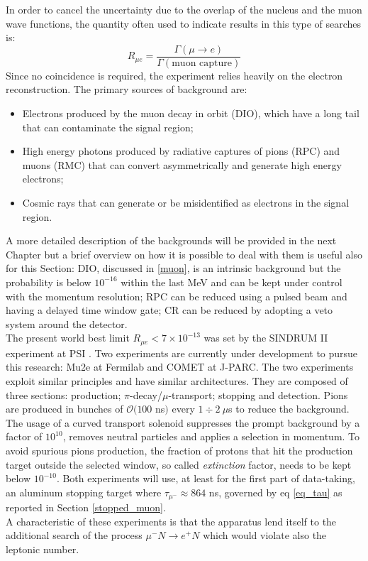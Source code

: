 \documentclass[12pt,a4paper,openright, oneside, titlepage]{book} %
\begin{document}
\noindent
In order to cancel the uncertainty due to the overlap of the nucleus and the muon wave functions, the quantity often used to indicate results in this type of searches is: 
$$R_{\mu e} = \frac{\Gamma(\mu\rightarrow e)}{\Gamma(\textrm{muon capture})}$$
Since no coincidence is required, the experiment relies heavily on the electron reconstruction. 
The primary sources of background are:
\begin{itemize}
\item Electrons produced by the muon decay in orbit (DIO), which have a long tail that can contaminate the signal region;
\item High energy photons produced by radiative captures of pions (RPC) and muons (RMC) that can convert asymmetrically and generate high energy electrons;
\item Cosmic rays that can generate or be misidentified as electrons in the signal region.
\end{itemize}
A more detailed description of the backgrounds will be provided in the next Chapter but a brief overview on how it is possible to deal with them is useful also for this Section: 
DIO, discussed in \ref{muon}, is an intrinsic background but the probability is below $10^{-16}$ within the last MeV and can be kept under control with the momentum resolution; RPC can be reduced using a pulsed beam and having a delayed time window gate; CR can be reduced by adopting a veto system around the detector.\\
The present world best limit  $R_{\mu e}<7\times10^{-13}$ was set by the SINDRUM II experiment at PSI \cite{SINDRUMII}.
Two experiments are currently under development to pursue this research: Mu2e \cite{MTDR} at Fermilab and COMET \cite{COMET_I} at J-PARC. 
The two experiments exploit similar principles and have similar architectures.
They are composed of three sections: production; $\pi$-decay/$\mu$-transport; stopping and detection. 
Pions are produced in bunches of $\mathcal{O}(100$ ns$)$ every $1\div 2\ \mu$s to reduce the background. 
The usage of a curved transport solenoid suppresses the prompt background by a factor of $10^{10}$, removes neutral particles and applies a selection in momentum. 
To avoid spurious pions production, the fraction of protons that hit the production target outside the selected window, so called \textit{extinction} factor, needs to be kept below $10^{-10}$. 
Both experiments will use, at least for the first part of data-taking, an aluminum stopping target where $\tau_{\mu^-}\approx 864$ ns, governed by eq \ref{eq_tau} as reported in Section \ref{stopped_muon}. \\
A characteristic of these experiments is that the apparatus lend itself to the additional search of the process $\mu^- N \rightarrow e^+ N$ which would violate also the leptonic number.
\end{document}
